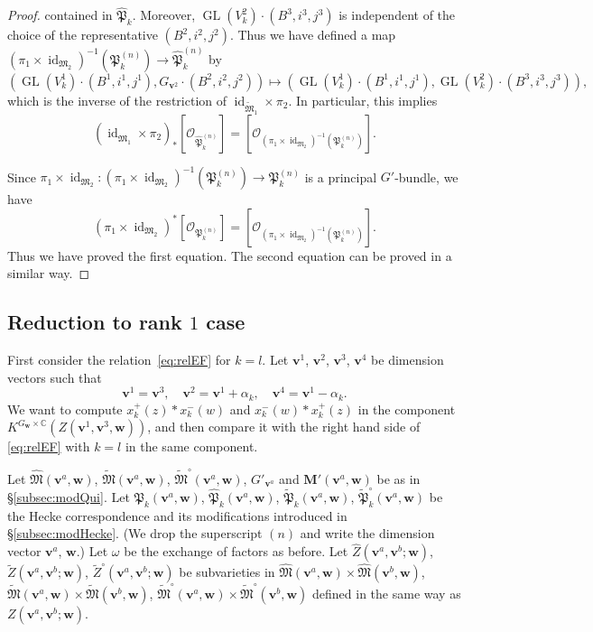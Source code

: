 \documentclass[12pt]{amsart}
\def\Bbb{\mathbb}
\def\frak{\mathfrak}
\theoremstyle{definition}
\theoremstyle{remark}
\numberwithin{equation}{subsection}
\newcommand{\subsecref}[1]{\S\ref{#1}}
\newcommand{\C}{{\Bbb C}}
\newcommand{\GL}{\operatorname{GL}}
\newcommand{\id}{\operatorname{id}}
\newcommand{\bM}{{\mathbf M}} %
\newcommand{\M}{{\frak M}} %
\newcommand{\bv}{{\mathbf v}} %
\newcommand{\bw}{{\mathbf w}} %
\newcommand{\Pa}{{\frak P}} %
\newcommand{\shfO}{\mathcal O}
\newcommand{\Mp}{\widetilde\M}
\newcommand{\Mpp}{\widehat\M}
\begin{document}
\begin{proof}
contained in $\widehat\Pa_k$. Moreover, $\GL(V^2_k)\cdot (B^3,i^3,j^3)$ is
independent of the choice of the representative $(B^2,i^2,j^2)$. Thus
we have defined a map $(\pi_1\times\id_{\M_2})^{-1}(\Pa_k^{(n)})\to
\widehat\Pa_k^{(n)}$ by
\begin{equation*}
(\GL(V^1_k)\cdot(B^1,i^1,j^1), G_{\bv^2}\cdot (B^2,i^2,j^2))
\mapsto 
(\GL(V^1_k)\cdot(B^1,i^1,j^1), \GL(V^2_k)\cdot (B^3,i^3,j^3)),
\end{equation*}
which is the inverse of the restriction of
$\id_{\Mp_1}\times \pi_2$. In particular, this implies
\begin{equation*}
  \left(\id_{\Mpp_1}\times\pi_2\right)_*
  [\shfO_{\widehat\Pa_k^{(n)}}] =
  [\shfO_{(\pi_1\times\id_{\M_2})^{-1}(\Pa_k^{(n)})}].
\end{equation*}

Since $\pi_1\times\id_{\M_2}\colon 
(\pi_1\times\id_{\M_2})^{-1}(\Pa_k^{(n)})\to \Pa_k^{(n)}$ is a principal
$G'$-bundle, we have
\begin{equation*}
  (\pi_1\times\id_{\M_2})^*[\shfO_{\Pa_k^{(n)}}] = 
[\shfO_{(\pi_1\times\id_{\M_2})^{-1}(\Pa_k^{(n)})}].
\end{equation*}
Thus we have proved the first equation. The second equation can be
proved in a similar way.
\end{proof}

\subsection{Reduction to rank $1$ case}
First consider the relation~\eqref{eq:relEF} for $k = l$.
Let $\bv^1$, $\bv^2$, $\bv^3$, $\bv^4$ be dimension vectors such that
\begin{equation*}
 \bv^1 = \bv^3, \quad
 \bv^2 = \bv^1 + \alpha_k, \quad
 \bv^4 = \bv^1 - \alpha_k.
\end{equation*}
We want to compute $x_{k}^+(z) * x_{k}^-(w)$ and $x_{k}^-(w) *
x_{k}^+(z)$ in the component $K^{G_\bw\times\C}(Z(\bv^1,\bv^3,\bw))$,
and then compare it with the right hand side of \eqref{eq:relEF} with
$k = l$ in the same component.

Let $\Mpp(\bv^a,\bw)$, $\Mp(\bv^a,\bw)$, $\Mp^\circ(\bv^a,\bw)$,
$G'_{\bv^a}$ and $\bM'(\bv^a,\bw)$ be as in \subsecref{subsec:modQui}.
Let $\Pa_k(\bv^a,\bw)$, $\widehat\Pa_k(\bv^a,\bw)$,
$\widetilde\Pa_k(\bv^a,\bw)$, $\widetilde\Pa_k^\circ(\bv^a,\bw)$ be
the Hecke correspondence and its modifications introduced in
\subsecref{subsec:modHecke}. (We drop the superscript $(n)$ and write
the dimension vector $\bv^a$, $\bw$.) Let $\omega$ be the exchange of
factors as before.
Let $\widehat Z(\bv^a,\bv^b;\bw)$, $\widetilde Z(\bv^a,\bv^b;\bw)$,
$\widetilde Z^\circ(\bv^a,\bv^b;\bw)$ be subvarieties in
$\Mpp(\bv^a,\bw)\times\Mpp(\bv^b,\bw)$,
$\Mp(\bv^a,\bw)\times\Mp(\bv^b,\bw)$,
$\Mp^\circ(\bv^a,\bw)\times\Mp^\circ(\bv^b,\bw)$ defined in the same
way as $Z(\bv^a,\bv^b;\bw)$.
\end{document}
